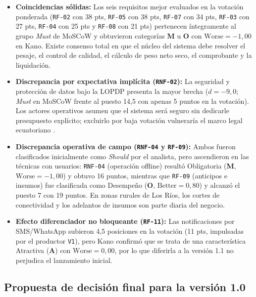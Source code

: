 \begin{itemize}[leftmargin=16pt,itemsep=3pt]
    \item \textbf{Coincidencias s\'olidas:} Los seis requisitos mejor evaluados en la votaci\'on ponderada (\texttt{RF-02} con 38 pts, \texttt{RF-05} con 38 pts, \texttt{RF-07} con 34 pts, \texttt{RF-03} con 27 pts, \texttt{RF-04} con 25 pts y \texttt{RF-08} con 21 pts) pertenecen \'integramente al grupo \textit{Must} de MoSCoW y obtuvieron categor\'ias \textbf{M} u \textbf{O} con $\text{Worse} = -1,00$ en Kano. Existe consenso total en que el n\'ucleo del sistema debe resolver el pesaje, el control de calidad, el c\'alculo de peso neto seco, el comprobante y la liquidaci\'on.
    \item \textbf{Discrepancia por expectativa impl\'icita (\texttt{RNF-02}):} La seguridad y protecci\'on de datos bajo la LOPDP presenta la mayor brecha ($d = -9,0$; \textit{Must} en MoSCoW frente al puesto 14,5 con apenas 5 puntos en la votaci\'on). Los actores operativos asumen que el sistema ser\'a seguro sin dedicarle presupuesto expl\'icito; excluirlo por baja votaci\'on vulnerar\'ia el marco legal ecuatoriano \cite{lopdp2021}.
    \item \textbf{Discrepancia operativa de campo (\texttt{RNF-04} y \texttt{RF-09}):} Ambos fueron clasificados inicialmente como \textit{Should} por el analista, pero ascendieron en las t\'ecnicas con usuarios: \texttt{RNF-04} (operaci\'on offline) result\'o Obligatoria (\textbf{M}, $\text{Worse} = -1,00$) y obtuvo 16 puntos, mientras que \texttt{RF-09} (anticipos e insumos) fue clasificada como Desempe\~no (\textbf{O}, $\text{Better} = 0,80$) y alcanz\'o el puesto 7 con 19 puntos. En zonas rurales de Los R\'ios, los cortes de conectividad y los adelantos de insumos son parte diaria del negocio.
    \item \textbf{Efecto diferenciador no bloqueante (\texttt{RF-11}):} Las notificaciones por SMS/WhatsApp subieron 4,5 posiciones en la votaci\'on (11 pts, impulsadas por el productor \texttt{V1}), pero Kano confirm\'o que se trata de una caracter\'istica Atractiva (\textbf{A}) con $\text{Worse} = 0,00$, por lo que diferirla a la versi\'on 1.1 no perjudica el lanzamiento inicial.
\end{itemize}

\subsection{Propuesta de decisi\'on final para la versi\'on 1.0}

